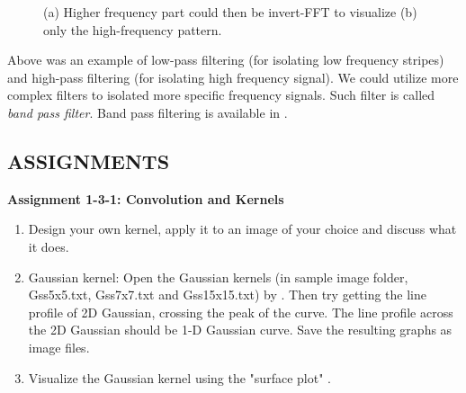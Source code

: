 \begin{figure}[htbp]
 \centering
 \caption{ (a) Higher frequency part could then be invert-FFT to visualize (b) only the high-frequency pattern.}
 \label{fig:invertToGetHighFrequencyImage}
\end{figure} 


Above was an example of low-pass filtering (for isolating low frequency
stripes) and high-pass filtering (for isolating high frequency signal).
We could utilize more complex filters to isolated more specific
frequency signals. Such filter is called \textit{band pass
filter}. Band pass filtering is
available in . 


\subsection{ASSIGNMENTS}

\textbf{\sffamily
Assignment 1-3-1: Convolution and Kernels
}

\begin{enumerate}
\item Design your own kernel, apply it to an image of your choice and
discuss what it does. 

\item Gaussian kernel: Open the Gaussian kernels (in sample image folder,
Gss5x5.txt, Gss7x7.txt and Gss15x15.txt) by . Then try getting the
line profile of 2D Gaussian, crossing the peak of the curve. The line
profile across the 2D Gaussian should be 1-D Gaussian curve. Save the
resulting graphs as image files. 

\item Visualize the Gaussian kernel using the "surface
plot" .
\end{enumerate}

